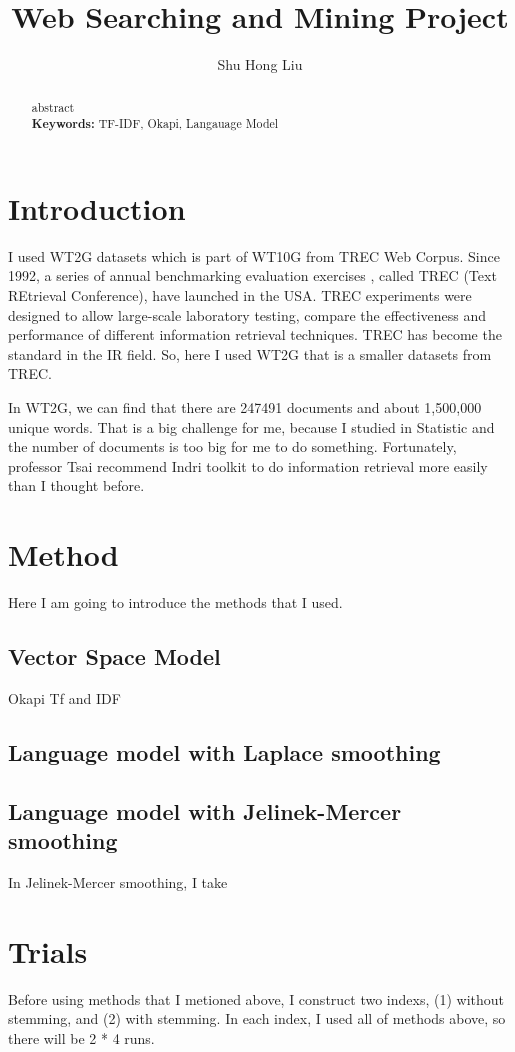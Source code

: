 \documentclass[a4pper,11pt,onecolumn]{article}
\title{Web Searching and Mining Project }
\author{Shu Hong Liu}
\begin{document}
\maketitle
\begin{abstract}
	abstract\\
{\bf Keywords:} TF-IDF, Okapi, Langauage Model
\end{abstract}
\section{Introduction}

I used WT2G datasets which is part of WT10G from TREC Web Corpus.
Since 1992, a series of annual benchmarking evaluation exercises , called TREC (Text REtrieval Conference), have launched in the USA. TREC experiments were designed to allow large-scale laboratory testing, compare the effectiveness and performance of different information retrieval techniques. TREC has become the standard in the IR field. So, here I used WT2G that is a smaller datasets from TREC.

In WT2G, we can find that there are 247491 documents and about 1,500,000 unique words. That is a big challenge for me, because I studied in Statistic and the number of documents is too big for me to do something. Fortunately, professor Tsai recommend Indri toolkit to do information retrieval more easily than I thought before.
\section{Method}
Here I am going to introduce the methods that I used.
\subsection{Vector Space Model}
Okapi Tf and IDF
\subsection{Language model with Laplace smoothing}

\subsection{Language model with Jelinek-Mercer smoothing}
In Jelinek-Mercer smoothing, I take
\section{Trials}
Before using methods that I metioned above, I construct two indexs, (1) without stemming, and (2) with stemming. In each index, I used all of methods above, so there will be 2 * 4 runs.
\end{document}
